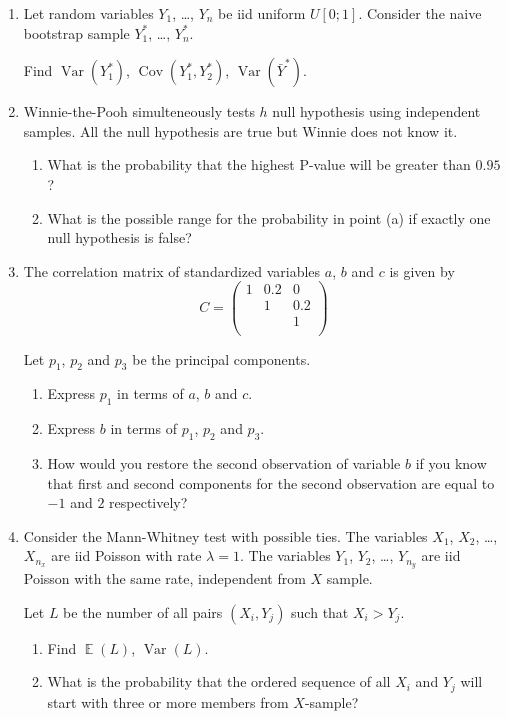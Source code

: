 \documentclass[12pt]{article}
\DeclareMathOperator{\Cov}{Cov}
\DeclareMathOperator{\E}{\mathbb{E}}
\DeclareMathOperator{\Var}{Var}
\begin{document}
\begin{enumerate}
 \item Let random variables $Y_1$, \ldots, $Y_n$ be iid uniform $U[0;1]$.
    Consider the naive bootstrap sample $Y_1^*$, \ldots, $Y_n^*$.

    Find $\Var(Y_1^*)$, $\Cov(Y_1^*, Y_2^*)$, $\Var(\bar Y^*)$.

    \item Winnie-the-Pooh simulteneously tests $h$ null hypothesis using independent samples. 
    All the null hypothesis are true but Winnie does not know it. 
    
    \begin{enumerate}
        \item What is the probability that the highest P-value will be greater than $0.95$?
        \item What is the possible range for the probability in point (a) if exactly one null hypothesis is false?
    \end{enumerate}

    \item The correlation matrix of standardized variables $a$, $b$ and $c$ is given by
    \[
    C = \begin{pmatrix}
        1 & 0.2 & 0 \\
         & 1 &  0.2 \\
         & & 1 \\
    \end{pmatrix}
    \]

    Let $p_1$, $p_2$ and $p_3$ be the principal components. 

    \begin{enumerate}
        \item Express $p_1$ in terms of $a$, $b$ and $c$. 
        \item Express $b$ in terms of $p_1$, $p_2$ and $p_3$. 
        \item How would you restore the second observation of variable $b$ if you know that first and second 
        components for the second observation are equal to $-1$ and $2$ respectively?
    \end{enumerate}

    \item Consider the Mann-Whitney test with possible ties. 
    The variables $X_1$, $X_2$, \ldots, $X_{n_x}$ are iid Poisson with rate $\lambda =1$. 
    The variables $Y_1$, $Y_2$, \ldots, $Y_{n_y}$ are iid Poisson with the same rate, independent from $X$ sample. 

    Let $L$ be the number of all pairs $(X_i, Y_j)$ such that $X_i > Y_j$.

    \begin{enumerate}
        \item Find $\E(L)$, $\Var(L)$. 
        \item What is the probability that the ordered sequence of all $X_i$ and $Y_j$ will start with 
        three or more members from $X$-sample?
    \end{enumerate}

\end{enumerate}
\end{document}
